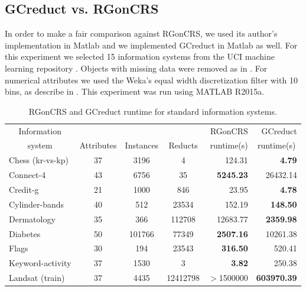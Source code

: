 \documentclass[number,preprint,review,12pt]{elsarticle}
\begin{document}
\subsection{GCreduct vs. RGonCRS}\label{sub:matlab}
	In order to make a fair comparison against RGonCRS, we used its author's implementation in Matlab and we implemented GCreduct in Matlab as well. For this experiment we selected 15 information systems from the UCI machine learning repository \citep{Bache13}. Objects with missing data were removed as in \citep{WangP07}. For numerical attributes we used the Weka's equal width discretization filter with 10 bins, as describe in \cite{Flores2010}. This experiment was run using MATLAB R2015a.
	
	\begin{table}[!htb]
		\caption{RGonCRS and GCreduct runtime for standard information systems.}\label{tab:matlab}
		\centering \footnotesize
		\begin{tabular}{|l|c|c|c|r|r|}
			\hline
			\multicolumn{1}{|c|}{Information}&&&& RGonCRS & GCreduct\\ 
			\multicolumn{1}{|c|}{system} & Attributes & Instances & Reducts & runtime(s) & \multicolumn{1}{c|}{runtime(s)}\\ 
			\hline
			Chess (kr-vs-kp)          & 37         & 3196      & 4        & 124.31            & \textbf{4.79}      \\
			Connect-4                 & 43         & 6756      & 35       & \textbf{5245.23}  & 26432.14           \\
			Credit-g                  & 21         & 1000      & 846      & 23.95             & \textbf{4.78}      \\
			Cylinder-bands            & 40         & 512       & 23534    & 152.19            & \textbf{148.50}    \\
			Dermatology               & 35         & 366       & 112708   & 12683.77          & \textbf{2359.98}   \\
			Diabetes                  & 50         & 101766    & 77349    & \textbf{2507.16}  & 10261.38           \\
			Flags                     & 30         & 194       & 23543    & \textbf{316.50}   & 520.41             \\
			Keyword-activity          & 37         & 1530      & 3        & \textbf{3.82}     & 250.38             \\
			Landsat (train)           & 37         & 4435      & 12412798 & $>$1500000        & \textbf{603970.39} \\

\end{tabular}
\end{table}
\end{document}
